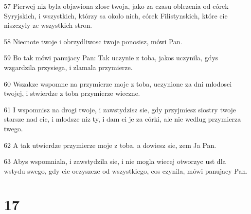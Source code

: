 \par 57 Pierwej niz byla objawiona zlosc twoja, jako za czasu oblezenia od córek Syryjskich, i wszystkich, którzy sa okolo nich, córek Filistynskich, które cie niszczyly ze wszystkich stron.
\par 58 Niecnote twoje i obrzydliwosc twoje ponosisz, mówi Pan.
\par 59 Bo tak mówi panujacy Pan: Tak uczynie z toba, jakos uczynila, gdys wzgardzila przysiega, i zlamala przymierze.
\par 60 Wszakze wspomne na przymierze moje z toba, uczynione za dni mlodosci twojej, i stwierdze z toba przymierze wieczne.
\par 61 I wspomnisz na drogi twoje, i zawstydzisz sie, gdy przyjmiesz siostry twoje starsze nad cie, i mlodsze niz ty, i dam ci je za córki, ale nie wedlug przymierza twego.
\par 62 A tak utwierdze przymierze moje z toba, a dowiesz sie, zem Ja Pan.
\par 63 Abys wspomniala, i zawstydzila sie, i nie mogla wiecej otworzyc ust dla wstydu swego, gdy cie oczyszcze od wszystkiego, cos czynila, mówi panujacy Pan.

\chapter{17}

